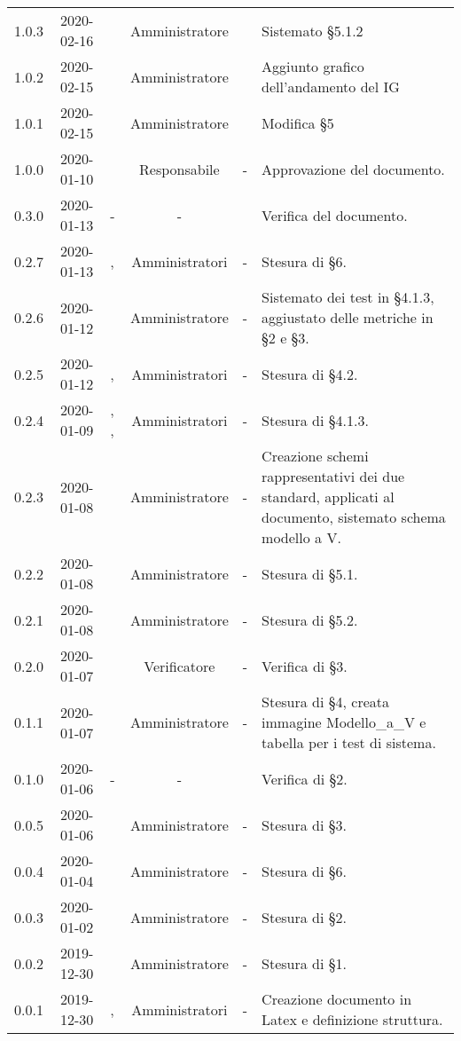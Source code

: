 {\begin{longtable}{ c c  C{2.5cm} c c C{3.5cm}}
1.0.3 & 2020-02-16 & \PF{} & Amministratore & \AT{} & Sistemato §5.1.2\\
1.0.2 & 2020-02-15 & \PF{} & Amministratore & \SE{} & Aggiunto grafico dell'andamento del IG \\
1.0.1 & 2020-02-15 & \PF{} & Amministratore & \AT{} & Modifica §5 \\
1.0.0 & 2020-01-10 & \SE{} & Responsabile & - & Approvazione del documento. \\
0.3.0 & 2020-01-13 & - & - & \LD{} & Verifica del documento. \\
0.2.7 & 2020-01-13 & \MC{}, \AT{} & Amministratori & - & Stesura di §6. \\
0.2.6 & 2020-01-12 & \AT{} & Amministratore & - & Sistemato dei test in §4.1.3, aggiustato delle metriche in §2 e §3. \\
0.2.5 & 2020-01-12 & \MC{}, \BR{} & Amministratori & - & Stesura di §4.2. \\
0.2.4 & 2020-01-09 & \MC{}, \AT{}, \BR{} & Amministratori & - & Stesura di §4.1.3. \\
0.2.3 & 2020-01-08 & \AT{} & Amministratore & - & Creazione schemi rappresentativi dei due standard, applicati al documento, sistemato schema modello a V. \\
0.2.2 & 2020-01-08 & \MC{} & Amministratore & - & Stesura di §5.1. \\
0.2.1 & 2020-01-08 & \AT{} & Amministratore & - & Stesura di §5.2. \\
0.2.0 & 2020-01-07 & \DF{} & Verificatore & - & Verifica di §3. \\
0.1.1 & 2020-01-07 & \AT{} & Amministratore & - & Stesura di §4, creata immagine Modello\_a\_V e tabella per i test di sistema. \\
0.1.0 & 2020-01-06 & - & - & \LD{} & Verifica di §2. \\
0.0.5 & 2020-01-06 & \BR{} & Amministratore & - & Stesura di §3. \\
0.0.4 & 2020-01-04 & \MC{} & Amministratore & - & Stesura di §6. \\
0.0.3 & 2020-01-02 & \MC{} & Amministratore & - & Stesura di §2. \\
0.0.2 & 2019-12-30 & \AT{} & Amministratore & - & Stesura di §1. \\
0.0.1 & 2019-12-30 & \AT{}, \MC{} & Amministratori & - & Creazione documento in Latex e definizione struttura. \\	
		
\end{longtable}
}
